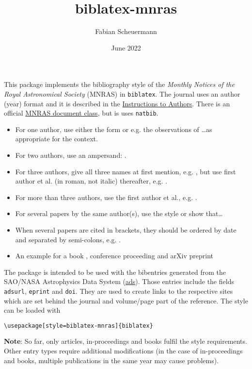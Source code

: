 \documentclass{scrartcl}
\title{biblatex-mnras}
\author{Fabian Scheuermann}
\date{June 2022}
\begin{document}
\maketitle

This package implements the bibliography style of the \emph{Monthly Notices of the Royal Astronomical Society} (MNRAS) in \texttt{biblatex}. The journal uses an author (year) format and it is described in the \href{https://academic.oup.com/mnras/pages/general_instructions?login=false#6.3\%20References\%20and\%20citations}{Instructions to Authors}. There is an official \href{https://www.ctan.org/tex-archive/macros/latex/contrib/mnras}{MNRAS document class}, but is uses \texttt{natbib}. \\

\begin{itemize}
  \setlength{\itemsep}{0pt}
    \item For one author, use either the form \parencite{Jacoby+1989a} or e.g. the observations of \textcite{Jacoby+1989a}\dots as appropriate for the context.
    \item For two authors, use an ampersand: \textcite{Ford+1978}. 
    \item For three authors, give all three names at first mention, e.g. \parencite{Baldwin+1981}, but use first author et al. (in roman, not italic) thereafter, e.g. \parencite{Baldwin+1981}.
    \item For more than three authors, use the first author et al., e.g. \parencite{Scheuermann+2022,Kreckel+2017}.
    \item For several papers by the same author(s), use the style \parencite{Jacoby+1989a,Jacoby1997} or \parencite{Anand+2021a,Anand+2021b} show that\dots
    \item When several papers are cited in brackets, they should be ordered by date and separated by semi-colons, e.g. \parencite{Lee+2022,Emsellem+2022,Leroy+2021a,Leroy+2021b}.
    \item An example for a book \parencite{Osterbrock+2006}, conference proceeding \parencite{Ciardullo+2013} and arXiv preprint \parencite{Barnes+2022}
\end{itemize}

The package is intended to be used with the bibentries generated from the SAO/NASA Astrophysics Data System (\href{https://ui.adsabs.harvard.edu/}{ads}). Those entries include the fields \texttt{adsurl}, \texttt{eprint} and \texttt{doi}. They are used to create links to the respective sites which are set behind the journal and volume/page part of the reference. The style can be loaded with

\begin{verbatim}
\usepackage[style=biblatex-mnras]{biblatex}
\end{verbatim}

\textbf{Note}: So far, only articles, in-proceedings and books fulfil the style requirements. Other entry types require additional modifications (in the case of in-proceedings and books, multiple publications in the same year may cause problems).

\newpage
\newrefcontext[sorting=nyt]
\printbibliography[title={References}]
\end{document}
